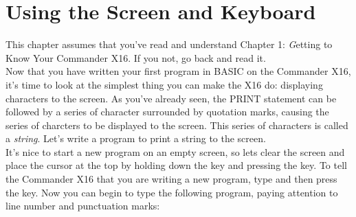 
\makeatletter\@openrightfalse
\part{Using the Screen and Keyboard}


\newpage
{}

This chapter assumes that you've read and understand Chapter 1: {\emph Getting
to Know Your Commander X16}.  If you not, go back and read it.\\

Now that you have written your first program in BASIC on the Commander X16,
it's time to look at the simplest thing you can make the X16 do: displaying
characters to the screen.  As you've already seen, the {\ttfamily PRINT}
statement can be followed by a series of character surrounded by quotation
marks, causing the series of charcters to be displayed to the screen.  This
series of characters is called a {\em string}.  Let's write a program to print
a string to the screen.\\

It's nice to start a new program on an empty screen, so lets clear the screen
and place the cursor at the top by holding down the \shiftkey key and pressing
the \clrhomekey key.  To tell the Commander X16 that you are writing a new
program, type  and then press
the \returnkey key.  Now you can begin to type the following program, paying
attention to line number and punctuation marks:\\

 \spacebar {} \spacebar
{}\key{,} \spacebar
{}\key{!} \returnkey


